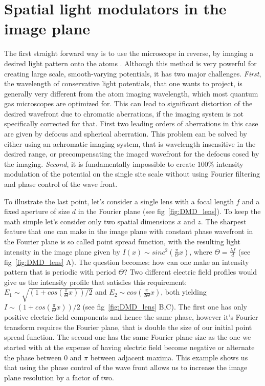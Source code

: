 \section{Spatial light modulators in the image plane}
The first straight forward way is to use the microscope in reverse, by imaging a desired light pattern onto the atoms \cite{P. Schauß thesis, RMA thesis, MAZU thesis}. Although this method is very powerful for creating large scale, smooth-varying potentials, it has two major challenges. \textit{First}, the wavelength of conservative light potentials, that one wants to project, is generally very different from the atom imaging wavelength, which most quantum gas microscopes are optimized for. This can lead to significant distortion of the desired wavefront due to chromatic aberrations, if the imaging system is not specifically corrected for that. First two leading orders of aberrations in this case are given by defocus and spherical aberration. This problem can be solved by either using an achromatic imaging system, that is wavelength insensitive in the desired range, or precompensating the imaged wavefront for the defocus cosed by the imaging. \textit{Second}, it is fundamentally impossible to create $100 \%$ intensity modulation of the potential on the single site scale without using Fourier filtering and phase control of the wave front. 

To illustrate the last point, let's consider a single lens with a focal length $f$ and a fixed aperture of size $d$ in the Fourier plane (see fig~\ref{fig:DMD_lens}). To keep the math simple let's consider only two spatial dimensions $x$ and $z$. The sharpest feature that one can make in the image plane with constant phase wavefront in the Fourier plane is so called point spread function, with the resulting light intensity in the image plane given by $I(x) \sim sinc^2(\frac{\pi}{\Theta} x)$, where $\Theta = \frac{\lambda f}{d}$ (see fig~\ref{fig:DMD_lens} A). The question becomes: how can one make an intensity pattern that is periodic with period $\Theta$? Two different electric field profiles would give us the intensity profile that satisfies this requirement: $E_1 \sim \sqrt{(1+cos(\frac{\pi}{\Theta}x))/2}$ and $E_2 \sim cos(\frac{\pi}{2\Theta} x)$, both yielding $I \sim (1+cos(\frac{\pi}{\Theta}x))/2$ (see fig~\ref{fig:DMD_lens} B,C). The first one has only positive electric field components and hence the same phase, however it's Fourier transform requires the Fourier plane, that is double the size of our initial point spread function. The second one has the same Fourier plane size as the one we started with at the expense of having electric field become negative or alternate the phase between $0$ and $\pi$ between adjacent maxima. This example shows us that using the phase control of the wave front allows us to increase the image plane resolution by a factor of two.

